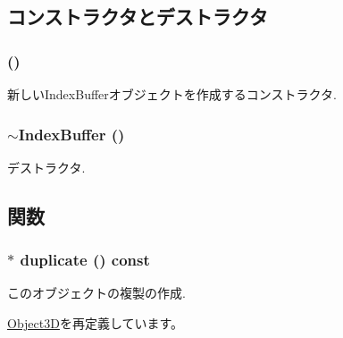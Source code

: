 \subsection{コンストラクタとデストラクタ}
\hypertarget{classm3g_1_1IndexBuffer_d2e68a2d7c6c753d3abfeef42ee79427}{
\subsubsection[{IndexBuffer}]{ ()}}
\label{classm3g_1_1IndexBuffer_d2e68a2d7c6c753d3abfeef42ee79427}


新しいIndexBufferオブジェクトを作成するコンストラクタ. \hypertarget{classm3g_1_1IndexBuffer_ac7952364fe4d2d7b2731da5380c841c}{
\subsubsection[{$\sim$IndexBuffer}]{\setlength{\rightskip}{0pt plus 5cm}$\sim${\bf IndexBuffer} ()}}
\label{classm3g_1_1IndexBuffer_ac7952364fe4d2d7b2731da5380c841c}


デストラクタ. 

\subsection{関数}
\hypertarget{classm3g_1_1IndexBuffer_fab6fc0a0ec393e527f849c3af10ad76}{
\subsubsection[{duplicate}]{ $\ast$ duplicate () const}}
\label{classm3g_1_1IndexBuffer_fab6fc0a0ec393e527f849c3af10ad76}


このオブジェクトの複製の作成. 

\hyperlink{classm3g_1_1Object3D_a25110dac934f867b83b73ad4741a0f4}{Object3D}を再定義しています。

